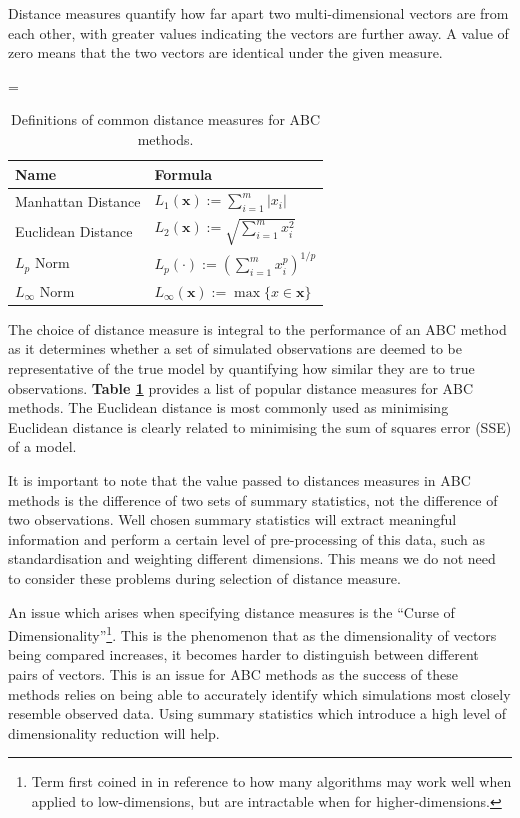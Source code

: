 \documentclass[11pt,a4paper]{article}
\theoremstyle{break}
\begin{document}
  \par Distance measures quantify how far apart two multi-dimensional vectors are from each other, with greater values indicating the vectors are further away. A value of zero means that the two vectors are identical under the given measure.

  \begin{table}[H]
    \everymath={\displaystyle}
    \centering
    \begin{tabular}{|l|l|}
      \hline
      \textbf{Name}&\textbf{Formula}\\\hline
      Manhattan Distance&$L_1(\mathbf{x}):=\sum_{i=1}^m|x_i|$\\\hline
      Euclidean Distance&$L_2(\mathbf{x}):=\sqrt{\sum_{i=1}^mx_i^2}$\\\hline
      $L_p$ Norm&$L_p(\cdot):=\left(\sum_{i=1}^mx_i^p\right)^{1/p}$\\\hline
      $L_\infty$ Norm&$L_\infty(\mathbf{x}):=\max\{x\in \mathbf{x}\}$\\\hline
    \end{tabular}
    \caption{Definitions of common distance measures for ABC methods.}
    \label{tab_common_distances}
  \end{table}

  \par The choice of distance measure is integral to the performance of an ABC method as it determines whether a set of simulated observations are deemed to be representative of the true model by quantifying how similar they are to true observations. \textbf{Table \ref{tab_common_distances}} provides a list of popular distance measures for ABC methods. The Euclidean distance is most commonly used as minimising Euclidean distance is clearly related to minimising the sum of squares error (SSE) of a model.

  \par It is important to note that the value passed to distances measures in ABC methods is the difference of two sets of summary statistics, not the difference of two observations. Well chosen summary statistics will extract meaningful information and perform a certain level of pre-processing of this data, such as standardisation and weighting different dimensions. This means we do not need to consider these problems during selection of distance measure.

  \par An issue which arises when specifying distance measures is the ``Curse of Dimensionality''\footnote{Term first coined in \cite[]{adaptive_control_processes} in reference to how many algorithms may work well when applied to low-dimensions, but are intractable when for higher-dimensions.}. This is the phenomenon that as the dimensionality of vectors being compared increases, it becomes harder to distinguish between different pairs of vectors. This is an issue for ABC methods as the success of these methods relies on being able to accurately identify which simulations most closely resemble observed data. Using summary statistics which introduce a high level of dimensionality reduction will help.
\end{document}
